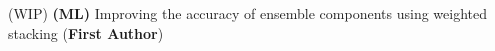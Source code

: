(WIP) \textbf{(ML)}{ Improving the accuracy of ensemble components using weighted stacking (\textbf{First Author})} \\
